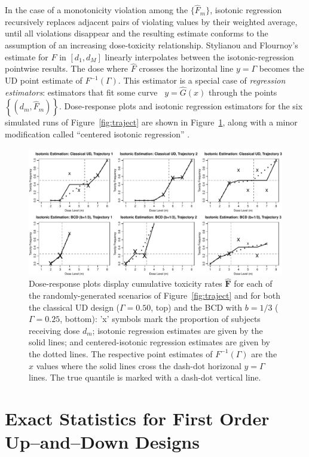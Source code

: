 In the case of a monotonicity violation among the $\{\hat{F}_m\}$, isotonic regression recursively replaces adjacent pairs of violating values by their weighted average, until all violations disappear and the resulting estimate conforms to the assumption of an increasing dose-toxicity relationship. Stylianou and Flournoy's estimate for $F$ in $[d_1,d_M]$ linearly interpolates between the isotonic-regression pointwise results. The dose where $\hat{F}$ crosses the horizontal line $y=\Gamma$ becomes the UD point estimate of $F^{-1}(\Gamma)$. This estimator is a special case of \emph{regression estimators}: estimators that fit some curve \ $y=\hat{G}(x)$ through the points $\left\{\left(d_m,\hat{F}_m\right)\right\}$.  Dose-response plots and isotonic regression estimators for the six simulated runs of Figure~\ref{fig:traject} are shown in Figure~\ref{fig:isot}, along with a minor modification called ``centered isotonic regression'' \citep[Section~3.3]{Oron07}.
%
\begin{figure}
\begin{center}
\includegraphics[scale=0.65]{isot}
\caption{Dose-response plots display cumulative toxicity rates $\mathbf{\hat{F}}$
for each of the randomly-generated scenarios of Figure~\ref{fig:traject} and for both the classical UD design ($\Gamma=0.50$, top) and the BCD with $b=1/3$ ($\Gamma=0.25$, bottom): 'x' symbols mark the proportion of subjects receiving dose $d_m$; isotonic regression estimates are given by the solid lines; and centered-isotonic regression estimates are given by the dotted lines.  The respective point estimates of $F^{-1}(\Gamma)$ are the $x$ values where the solid lines cross the dash-dot horizonal $y=\Gamma$ lines. The true quantile is marked with a dash-dot vertical line.}\label{fig:isot}
\end{center}
\end{figure}


\chapter{Exact Statistics for First Order Up--and--Down Designs}

